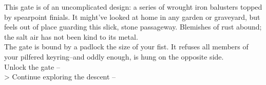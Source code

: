 This gate is of an uncomplicated design: a series of wrought iron balusters topped by spearpoint finials. It might've looked at home in any garden or graveyard, but feels out of place guarding this slick, stone passageway. Blemishes of rust abound; the salt air has not been kind to its metal.\\

The gate is bound by a padlock the size of your fist. It refuses all members of your pilfered keyring--and oddly enough, is hung on the opposite side.\\

 Unlock the gate -- \\
> Continue exploring the descent -- 